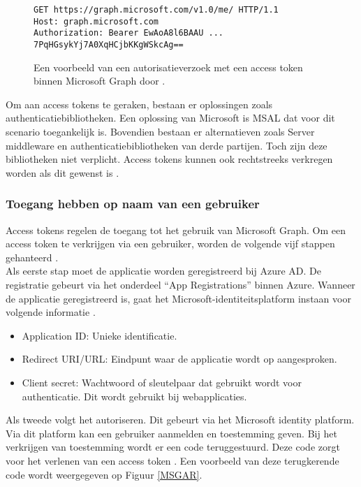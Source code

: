 \begin{figure}[h]
    \scriptsize
    \begin{verbatim}
GET https://graph.microsoft.com/v1.0/me/ HTTP/1.1
Host: graph.microsoft.com
Authorization: Bearer EwAoA8l6BAAU ... 7PqHGsykYj7A0XqHCjbKKgWSkcAg==
    \end{verbatim}    
    \caption[Voorbeeld Microsoft Graph Authorization Request]{Een voorbeeld van een autorisatieverzoek met een access token binnen Microsoft Graph door \textcite{Microsoft2022b}.}
    \label{MSGA}
\end{figure}

Om aan access tokens te geraken, bestaan er oplossingen zoals authenticatiebibliotheken. Een oplossing van Microsoft is \ac{MSAL} dat voor dit scenario toegankelijk is. Bovendien bestaan er alternatieven zoals Server middleware en authenticatiebibliotheken van derde partijen. Toch zijn deze bibliotheken niet verplicht. Access tokens kunnen ook rechtstreeks verkregen worden als dit gewenst is \autocite{Microsoft2022b}. 

\subsubsection{Toegang hebben op naam van een gebruiker}


Access tokens regelen de toegang tot het gebruik van Microsoft Graph. Om een access token te verkrijgen via een gebruiker, worden de volgende vijf stappen gehanteerd \autocite{Microsoft2023r}. \\

Als eerste stap moet de applicatie worden geregistreerd bij Azure \ac{AD}. De registratie gebeurt via het onderdeel “App Registrations” binnen Azure. Wanneer de applicatie geregistreerd is, gaat het Microsoft-identiteitsplatform instaan voor volgende informatie \autocite{Microsoft2023r}. 

\begin{itemize}
    \item Application ID: Unieke identificatie.
    \item Redirect URI/URL: Eindpunt waar de applicatie wordt op aangesproken.
    \item Client secret: Wachtwoord of sleutelpaar dat gebruikt wordt voor authenticatie. Dit wordt gebruikt bij webapplicaties.
\end{itemize}

Als tweede volgt het autoriseren. Dit gebeurt via het Microsoft identity platform. Via dit platform kan een gebruiker aanmelden en toestemming geven. Bij het verkrijgen van toestemming wordt er een code teruggestuurd. Deze code zorgt voor het verlenen van een access token \autocite{Microsoft2023r}. Een voorbeeld van deze terugkerende code wordt weergegeven op Figuur \ref{MSGAR}. \\

